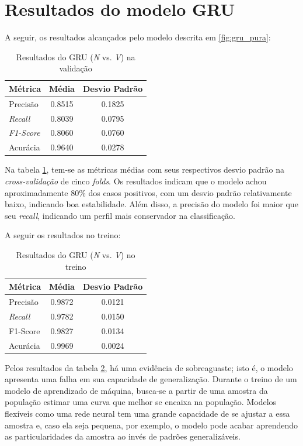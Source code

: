 \documentclass[
    12pt,                %
    openright,           %
    oneside,             %
    a4paper,             %
    brazil               %
]{abntex2}
\begin{document}
\section{Resultados do modelo GRU}

A seguir, os resultados alcançados pelo modelo descrita em \ref{fig:gru_pura}:

\begin{table}[H]
\centering
\caption{Resultados do GRU (\textit{N} vs. \textit{V}) na validação}
\label{tab:resultado_cv_gru_validacao}
\begin{tabular}{lcc}
\hline
\textbf{Métrica} & \textbf{Média} & \textbf{Desvio Padrão} \\
\hline
Precisão & 0.8515 & 0.1825 \\
\textit{Recall} & 0.8039  & 0.0795 \\
\textit{F1-Score} & 0.8060 & 0.0760 \\
Acurácia & 0.9640 & 0.0278 \\
\hline
\end{tabular}
\end{table}

Na tabela \ref{tab:resultado_cv_gru_validacao}, tem-se as métricas médias com seus respectivos desvio padrão na \textit{cross-validação} de cinco \textit{folds}.
Os resultados indicam que o modelo achou aproximadamente 80\% dos casos positivos, com um desvio padrão relativamente baixo, indicando boa estabilidade.
Além disso, a precisão do modelo foi maior que seu \textit{recall}, indicando um perfil mais conservador na classificação. 

A seguir os resultados no treino:

\begin{table}[H]
\centering
\caption{Resultados do GRU (\textit{N} vs. \textit{V}) no treino}
\label{tab:resultado_cv_gru_treino}
\begin{tabular}{lcc}
\hline
\textbf{Métrica} & \textbf{Média} & \textbf{Desvio Padrão} \\
\hline
Precisão & 0.9872 & 0.0121 \\
\textit{Recall} & 0.9782 & 0.0150 \\
F1-Score & 0.9827 & 0.0134 \\
Acurácia & 0.9969 & 0.0024 \\
\hline
\end{tabular}
\end{table}

Pelos resultados da tabela \ref{tab:resultado_cv_gru_treino}, há uma evidência de sobreaguaste; isto é, o modelo apresenta uma falha em sua capacidade
de generalização. Durante o treino de um modelo de aprendizado de máquina, busca-se a partir de uma amostra da população estimar uma curva que melhor
se encaixa na população. Modelos flexíveis como uma rede neural tem uma grande capacidade de se ajustar a essa amostra e, caso ela seja pequena, por exemplo,
o modelo pode acabar aprendendo as particularidades da amostra ao invés de padrões generalizáveis. 
\end{document}
